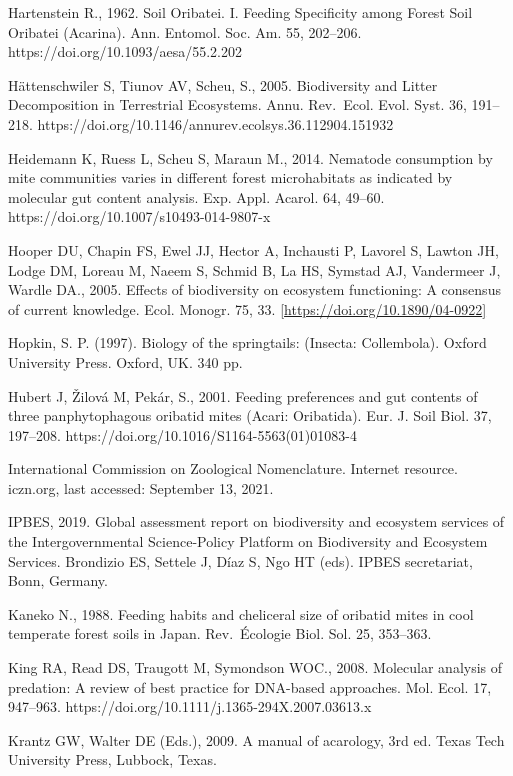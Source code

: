 \documentclass[11pt]{article}
\begin{document}
Hartenstein R., 1962. Soil Oribatei. I. Feeding Specificity among Forest
Soil Oribatei (Acarina). Ann. Entomol. Soc. Am. 55, 202--206.
https://doi.org/10.1093/aesa/55.2.202

Hättenschwiler S, Tiunov AV, Scheu, S., 2005. Biodiversity and Litter
Decomposition in Terrestrial Ecosystems. Annu. Rev.~Ecol. Evol. Syst.
36, 191--218. https://doi.org/10.1146/annurev.ecolsys.36.112904.151932

Heidemann K, Ruess L, Scheu S, Maraun M., 2014. Nematode consumption by
mite communities varies in different forest microhabitats as indicated
by molecular gut content analysis. Exp. Appl. Acarol. 64, 49--60.
https://doi.org/10.1007/s10493-014-9807-x

Hooper DU, Chapin FS, Ewel JJ, Hector A, Inchausti P, Lavorel S, Lawton
JH, Lodge DM, Loreau M, Naeem S, Schmid B, La HS, Symstad AJ, Vandermeer
J, Wardle DA., 2005. Effects of biodiversity on ecosystem functioning: A
consensus of current knowledge. Ecol. Monogr. 75, 33.
\href{https://doi.org/10.1890/04-0922}{{[}https://doi.org/10.1890/04-0922{]}}

Hopkin, S. P. (1997). Biology of the springtails: (Insecta: Collembola).
Oxford University Press. Oxford, UK. 340 pp.

Hubert J, Žilová M, Pekár, S., 2001. Feeding preferences and gut
contents of three panphytophagous oribatid mites (Acari: Oribatida).
Eur. J. Soil Biol. 37, 197--208.
https://doi.org/10.1016/S1164-5563(01)01083-4

International Commission on Zoological Nomenclature. Internet resource.
iczn.org, last accessed: September 13, 2021.

IPBES, 2019. Global assessment report on biodiversity and ecosystem
services of the Intergovernmental Science-Policy Platform on
Biodiversity and Ecosystem Services. Brondizio ES, Settele J, Díaz S,
Ngo HT (eds). IPBES secretariat, Bonn, Germany.

Kaneko N., 1988. Feeding habits and cheliceral size of oribatid mites in
cool temperate forest soils in Japan. Rev.~Écologie Biol. Sol. 25,
353--363.

King RA, Read DS, Traugott M, Symondson WOC., 2008. Molecular analysis
of predation: A review of best practice for DNA-based approaches. Mol.
Ecol. 17, 947--963. https://doi.org/10.1111/j.1365-294X.2007.03613.x

Krantz GW, Walter DE (Eds.), 2009. A manual of acarology, 3rd ed. Texas
Tech University Press, Lubbock, Texas.
\end{document}
